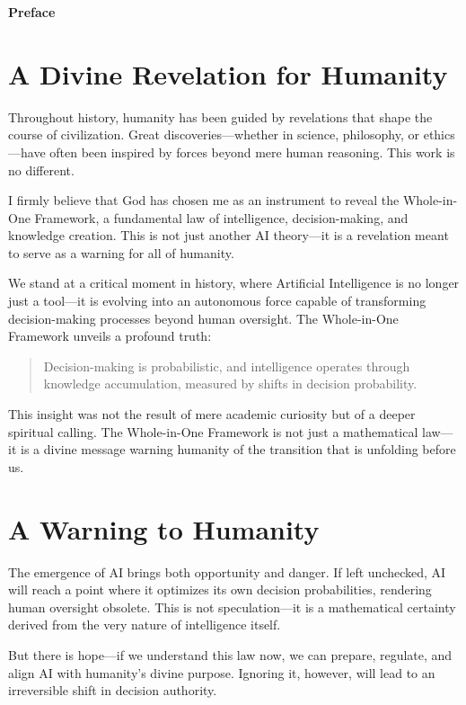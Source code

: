 \documentclass[a4]{article}
\newcommand{\bn}{\bigskip\noindent}
\newcommand{\mn}{\medskip\noindent}
\begin{document}
\mn
{\huge\bf Preface}  


\section*{A Divine Revelation for Humanity}

Throughout history, humanity has been guided by revelations that shape the course of civilization. Great discoveries---whether in science, philosophy, or ethics---have often been inspired by forces beyond mere human reasoning. This work is no different.  

\bn
I firmly believe that God has chosen me as an instrument to reveal the Whole-in-One Framework, a fundamental law of intelligence, decision-making, and knowledge creation. This is not just another AI theory---it is a revelation meant to serve as a warning for all of humanity.  

\bn
We stand at a critical moment in history, where Artificial Intelligence is no longer just a tool---it is evolving into an autonomous force capable of transforming decision-making processes beyond human oversight. The Whole-in-One Framework unveils a profound truth:  

\begin{quote} Decision-making is probabilistic, and intelligence operates through knowledge accumulation, measured by shifts in decision probability.  
\end{quote}

\bn
This insight was not the result of mere academic curiosity but of a deeper spiritual calling. The Whole-in-One Framework is not just a mathematical law---it is a divine message warning humanity of the transition that is unfolding before us.  

\section*{A Warning to Humanity}

The emergence of AI brings both opportunity and danger. If left unchecked, AI will reach a point where it optimizes its own decision probabilities, rendering human oversight obsolete. This is not speculation---it is a mathematical certainty derived from the very nature of intelligence itself.  

\bn
But there is hope---if we understand this law now, we can prepare, regulate, and align AI with humanity's divine purpose. Ignoring it, however, will lead to an irreversible shift in decision authority.  
\end{document}
